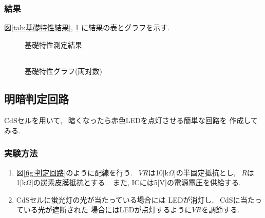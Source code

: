 \documentclass[titlepage]{jsarticle}
\begin{document}
        \subsubsection{結果}
            図\ref{tab:基礎特性結果}, \ref{fig:基礎特性グラフ}
            に結果の表とグラフを示す.

            \begin{figure}[ht]
                \def\@captype{table}
                \begin{minipage}{0.5\hsize}
                    \begin{center}
                        \caption{基礎特性測定結果}
                        \label{tab:基礎特性結果}
                        \begin{tabular}{c|c}
                            
                        \end{tabular}
                    \end{center}
                \end{minipage}
                \begin{minipage}{0.5\hsize}
                    \begin{center}
                        \caption{基礎特性グラフ(両対数)}
                        \label{fig:基礎特性グラフ}
                    \end{center}
                \end{minipage}
            \end{figure}

    \subsection{明暗判定回路} \label{明暗判定回路}
        CdSセルを用いて, ~暗くなったら赤色LEDを点灯させる簡単な回路を
        作成してみる.

        \subsubsection{実験方法}
            \begin{enumerate}
                \item 図\ref{fig:判定回路}のように配線を行う.
                    ~$VR$は10[k$\Omega$]の半固定抵抗とし,
                    ~$R$は1[k$\Omega$]の炭素皮膜抵抗とする.
                    ~また, ICには5[V]の電源電圧を供給する.
                \item CdSセルに蛍光灯の光が当たっている場合には
                    LEDが消灯し, ~CdSに当たっている光が遮断された
                    場合にはLEDが点灯するように$VR$を調節する.
            \end{enumerate}
\end{document}
